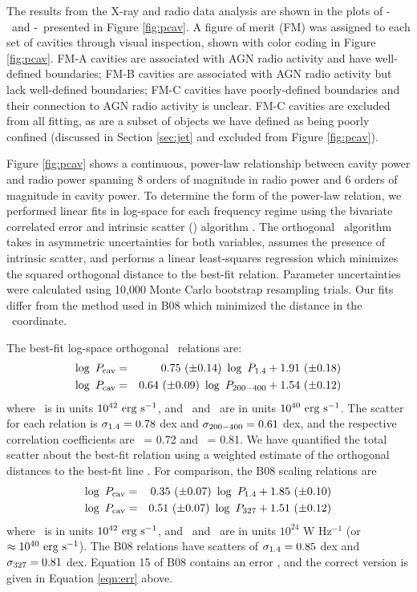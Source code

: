 \documentclass[12pt, preprint]{aastex}
\begin{document}
The results from the X-ray and radio data analysis are shown in the
plots of \pcav-\phigh\ and \pcav-\plow\ presented in Figure
\ref{fig:pcav}. A figure of merit (FM) was assigned to each set of
cavities through visual inspection, shown with color coding in Figure
\ref{fig:pcav}. FM-A cavities are associated with AGN radio activity
and have well-defined boundaries; FM-B cavities are associated with
AGN radio activity but lack well-defined boundaries; FM-C cavities
have poorly-defined boundaries and their connection to AGN radio
activity is unclear. FM-C cavities are excluded from all fitting, as
are a subset of objects we have defined as being poorly confined
(discussed in Section \ref{sec:jet} and excluded from Figure
\ref{fig:pcav}).

Figure \ref{fig:pcav} shows a continuous, power-law relationship
between cavity power and radio power spanning 8 orders of magnitude in
radio power and 6 orders of magnitude in cavity power. To determine
the form of the power-law relation, we performed linear fits in
log-space for each frequency regime using the bivariate correlated
error and intrinsic scatter (\bces) algorithm \citep{bces}. The
orthogonal \bces\ algorithm takes in asymmetric uncertainties for both
variables, assumes the presence of intrinsic scatter, and performs a
linear least-squares regression which minimizes the squared orthogonal
distance to the best-fit relation. Parameter uncertainties were
calculated using 10,000 Monte Carlo bootstrap resampling trials. Our
fits differ from the method used in B08 which minimized the distance
in the \pcav\ coordinate.

The best-fit log-space orthogonal \bces\ relations are:
\begin{eqnarray}
  \log~P_{\rm{cav}} &=& 0.75~(\pm 0.14)~\log~P_{\mathrm{1.4}} + 1.91~(\pm 0.18) \label{eqn:high}\\
  \log~P_{\rm{cav}} &=& 0.64~(\pm 0.09)~\log~P_{\mathrm{200-400}} + 1.54~(\pm 0.12) \label{eqn:low}
\end{eqnarray}
where \pcav\ is in units $10^{42} ~\rm{\mbox{\ensuremath{\rm{erg}}}~\ensuremath{\rm{\mbox{\ensuremath{\rm{s}}}^{-1}}}}$, and \phigh\ and \plow\ are
in units $10^{40} ~\rm{\mbox{\ensuremath{\rm{erg}}}~\ensuremath{\rm{\mbox{\ensuremath{\rm{s}}}^{-1}}}}$. The scatter for each relation is $\sigma_{\mathrm{1.4}} =
0.78$ dex and $\sigma_{\mathrm{200-400}} = 0.61$ dex, and the respective correlation
coefficients are \rhigh\ = 0.72 and \rlow\ = 0.81. We have quantified
the total scatter about the best-fit relation using a weighted
estimate of the orthogonal distances to the best-fit line
\citep[see][]{2009A&A...498..361P}. For comparison, the B08 scaling
relations are
\begin{eqnarray}
  \log~P_{\rm{cav}} &=& 0.35~(\pm 0.07)~\log~P_{\mathrm{1.4}} + 1.85~(\pm 0.10) \\
  \log~P_{\rm{cav}} &=& 0.51~(\pm 0.07)~\log~P_{\mathrm{327}} + 1.51~(\pm 0.12) \label{eqn:err}
\end{eqnarray}
where \pcav\ is in units $10^{42} ~\rm{\mbox{\ensuremath{\rm{erg}}}~\ensuremath{\rm{\mbox{\ensuremath{\rm{s}}}^{-1}}}}$, and \phigh\ and \pthree\ are
in units $10^{24}$ W Hz$^{-1}$ (or $\approx 10^{40} ~\rm{\mbox{\ensuremath{\rm{erg}}}~\ensuremath{\rm{\mbox{\ensuremath{\rm{s}}}^{-1}}}}$). The B08
relations have scatters of $\sigma_{\mathrm{1.4}} = 0.85$ dex and $\sigma_{\mathrm{327}} = 0.81$
dex. Equation 15 of B08 contains an error \citep{birzan08err}, and the
correct version is given in Equation \ref{eqn:err} above.
\end{document}
